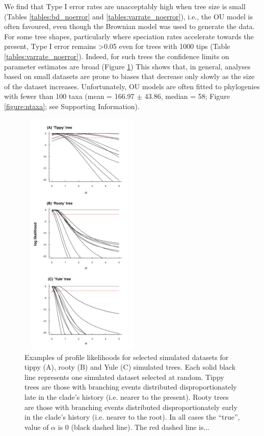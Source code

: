 \documentclass[a4paper,12pt]{article}
\begin{document}
    We find that Type I error rates are unacceptably high when tree size is small (Tables \ref{tables:bd_noerror} and \ref{tables:varrate_noerror}), i.e., the OU model is often favoured, even though the Brownian model was used to generate the data. 
    For some tree shapes, particularly where speciation rates accelerate towards the present, Type I error remains \textgreater 0.05 even for trees with 1000 tips (Table \ref{tables:varrate_noerror}). 
    Indeed, for such trees the confidence limits on parameter estimates are broad (Figure \ref{figure:ouprofiles})
    This shows that, in general, analyses based on small datasets are prone to biases that decrease only slowly as the size of the dataset increases. 
    Unfortunately, OU models are often fitted to phylogenies with fewer than 100 taxa (mean = 166.97 $\pm$ 43.86, median = 58; Figure \ref{figure:ntaxa}; see Supporting Information). 

    \begin{figure}[!htbp]
      \centering
      \includegraphics[width=6cm, height=12cm, keepaspectratio=true]{Figures/OhYou_Figure2.pdf}
      \caption{Examples of profile likelihoods for selected simulated datasets for tippy (A), rooty (B) and Yule (C) simulated trees. 
      Each solid black line represents one simulated dataset selected at random. 
      Tippy trees are those with branching events distributed disproportionately late in the clade's history (i.e. nearer to the present).
      Rooty trees are those with branching events distributed disproportionately early in the clade's history (i.e. nearer to the root). In all cases the ``true'', value of $\alpha$ is 0 (black dashed line). The red dashed line is... %
      }
      \label{figure:ouprofiles}
\end{figure}
\end{document}
